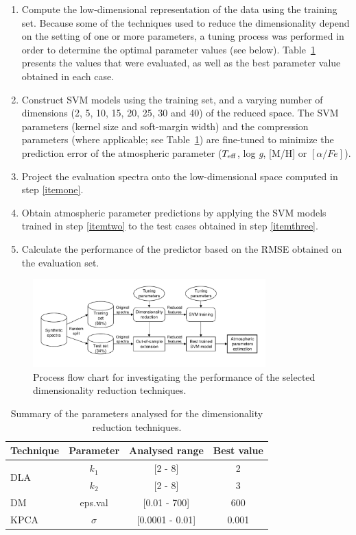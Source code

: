 \documentclass[a4paper,fleqn,usenatbib]{mnras}
\begin{document}
{{{\begin{enumerate}
\item \label{itemone} Compute the low-dimensional representation of
  the data using the training set. Because some of the techniques used
  to reduce the dimensionality depend on the setting of one or more
  parameters, a tuning process was performed in order to determine the
  optimal parameter values (see below). Table~\ref{tab:parameters} presents the
  values that were evaluated, as well as the best parameter value
  obtained in each case.
\item \label{itemtwo} Construct SVM models using the training set, and a varying
  number of dimensions (2, 5, 10, 15, 20, 25, 30 and 40) of the
  reduced space. The SVM parameters (kernel size and soft-margin
  width) and the compression parameters (where applicable; see 
  Table~\ref{tab:parameters}) are fine-tuned to minimize the prediction error of the
  atmospheric parameter ($T_{\rm eff}$, log \textit{g}, [M/H] or 
  $\left[ \alpha/Fe \right]$).
\item \label{itemthree} Project the evaluation spectra onto the
  low-dimensional space computed in step \ref{itemone}.
\item Obtain atmospheric parameter predictions by applying the SVM
  models trained in step \ref{itemtwo} to the test cases obtained in
  step \ref{itemthree}.
\item Calculate the performance of the predictor based on the RMSE
  obtained on the evaluation set.
\end{enumerate}

\begin{figure}
\centering\includegraphics[width=0.8\textwidth]{flowchart.pdf}
\caption{Process flow chart for investigating the performance of the 
selected dimensionality reduction techniques.}
\label{fig:flowchart}
\end{figure}

\begin{table}
\centering
\caption{Summary of the parameters analysed for the 
dimensionality reduction techniques.}
\label{tab:parameters}
\begin{tabular}{l c c c}
\hline
\textbf{Technique} & \textbf{Parameter} & \textbf{Analysed range} & \textbf{Best value} \\
\hline
\multirow{2}{*}{DLA} 
	& $k_1$ & [2 - 8]  & 2 \\\cline{2-4}
	& $k_2$ & [2 - 8]  & 3 \\\hline
DM & eps.val & [0.01 - 700] & 600 \\\hline
KPCA & $\sigma$ & [0.0001 - 0.01] & 0.001 \\
\hline
\end{tabular}
\end{table}

}}}
\end{document}
